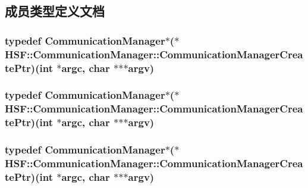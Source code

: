\subsection{成员类型定义文档}
\hypertarget{classHSF_1_1CommunicationManager_a11ce3f8f0c5cf854ecc7a77313c7ae2d}{
\subsubsection[{CommunicationManagerCreatePtr}]{\setlength{\rightskip}{0pt plus 5cm}typedef {\bf CommunicationManager}$\ast$($\ast$ {\bf HSF::CommunicationManager::CommunicationManagerCreatePtr})(int $\ast$argc, char $\ast$$\ast$$\ast$argv)}}
\label{classHSF_1_1CommunicationManager_a11ce3f8f0c5cf854ecc7a77313c7ae2d}
\hypertarget{classHSF_1_1CommunicationManager_a11ce3f8f0c5cf854ecc7a77313c7ae2d}{
\subsubsection[{CommunicationManagerCreatePtr}]{\setlength{\rightskip}{0pt plus 5cm}typedef {\bf CommunicationManager}$\ast$($\ast$ {\bf HSF::CommunicationManager::CommunicationManagerCreatePtr})(int $\ast$argc, char $\ast$$\ast$$\ast$argv)}}
\label{classHSF_1_1CommunicationManager_a11ce3f8f0c5cf854ecc7a77313c7ae2d}
\hypertarget{classHSF_1_1CommunicationManager_a11ce3f8f0c5cf854ecc7a77313c7ae2d}{
\subsubsection[{CommunicationManagerCreatePtr}]{\setlength{\rightskip}{0pt plus 5cm}typedef {\bf CommunicationManager}$\ast$($\ast$ {\bf HSF::CommunicationManager::CommunicationManagerCreatePtr})(int $\ast$argc, char $\ast$$\ast$$\ast$argv)}}
\label{classHSF_1_1CommunicationManager_a11ce3f8f0c5cf854ecc7a77313c7ae2d}


